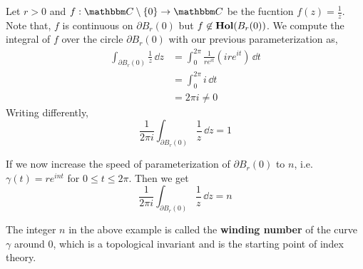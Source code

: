 \documentclass[../ComplexAnalysis_Notes.tex]{subfiles}
\begin{document}
\begin{Eg}{}{}
  Let \(r > 0\) and \(f : \C \setminus \{0\} \to \C\) be the fucntion \(f(z) = \frac 1z\). Note that, \(f\) is continuous on \(\partial B_r(0)\) but \(f \not\in \operatorname{\mathbf{Hol}}(B_r(0)) \). We compute the integral of \(f\) over the circle \(\partial B_r(0)\) with our previous parameterization as,
  \begin{align*}
    \int_{\partial B_r(0)} \frac 1z \, \dd{z}
     & = \int_0^{2\pi} \frac{1}{re^{it}} (ire^{it}) \, \dd{t} \\
     & = \int_0^{2\pi} i \, \dd{t}                            \\
     & = 2\pi i \neq 0
  \end{align*}
  Writing differently,
  \[
    \frac 1{2\pi i} \int_{\partial B_r(0)} \frac 1z \, \dd{z} = 1
  \]

  If we now increase the speed of parameterization of \(\partial B_r(0)\) to \(n\), i.e. \(\gamma(t) = re^{int}\) for \(0 \leq t \leq 2\pi\). Then we get
  \[
    \frac 1{2\pi i} \int_{\partial B_r(0)} \frac 1z \, \dd{z} = n
  \]
\end{Eg}

The integer \(n\) in the above example is called the \textbf{winding number} of the curve \(\gamma\) around \(0\), which is a topological invariant and is the starting point of index theory.
\end{document}
